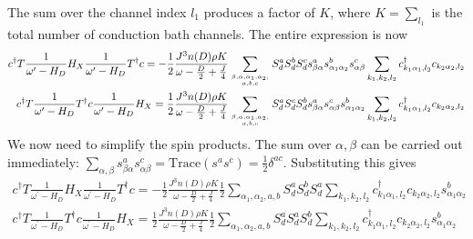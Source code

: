 \documentclass[12pt]{revtex4-2}
\begin{document}
The sum over the channel index \(l_1\) produces a factor of \(K\), where \(K = \sum_{l_1}\) is the total number of conduction bath channels. The entire expression is now
\begin{align}
	\label{first_term}
	c^\dagger T \frac{1}{\omega^\prime - H_D} H_X \frac{1}{\omega^\prime - H_D} T^\dagger c = -\frac{1}{2}\frac{J^3 n(D) \rho K}{\omega - \frac{D}{2} + \frac{J}{4}}\sum_{\beta, \alpha, \alpha_1,\alpha_2,\atop{a,b,c}} S_d^a S_d^b S_d^c s^a_{\beta \alpha} s^b_{\alpha_1 \alpha_2} s^c_{\alpha \beta} \sum_{k_1,k_2,l_2} c^\dagger_{k_1\alpha_1,l_2}c_{k_2 \alpha_2,l_2}\\
	c^\dagger T \frac{1}{\omega^\prime - H_D} T^\dagger c \frac{1}{\omega^\prime - H_D} H_X = \frac{1}{2}\frac{J^3 n(D) \rho K}{\omega - \frac{D}{2} + \frac{J}{4}}\sum_{\beta, \alpha, \alpha_1,\alpha_2,\atop{a,b,c}} S_d^a S_d^c S_d^b s^a_{\beta \alpha} s^c_{\alpha \beta} s^b_{\alpha_1 \alpha_2} \sum_{k_1,k_2,l_2}c^\dagger_{k_1\alpha_1,l_2}c_{k_2 \alpha_2,l_2}
\end{align}
We now need to simplify the spin products. The sum over \(\alpha,\beta\) can be carried out immediately: \(\sum_{\alpha,\beta} s^a_{\beta \alpha} s^c_{\alpha \beta} = \text{Trace}\left(s^a s^c\right) = \frac{1}{2}\delta^{ac}\). Substituting this gives
\begin{align}
	c^\dagger T \frac{1}{\omega^\prime - H_D} H_X \frac{1}{\omega^\prime - H_D} T^\dagger c = -\frac{1}{2}\frac{J^3 n(D) \rho K}{\omega - \frac{D}{2} + \frac{J}{4}}\frac{1}{2}\sum_{\alpha_1,\alpha_2,a,b} S_d^a S_d^b S_d^a \sum_{k_1,k_2,l_2} c^\dagger_{k_1\alpha_1,l_2}c_{k_2 \alpha_2,l_2}s^b_{\alpha_1 \alpha_2} \\
	c^\dagger T \frac{1}{\omega^\prime - H_D} T^\dagger c \frac{1}{\omega^\prime - H_D} H_X = \frac{1}{2}\frac{J^3 n(D) \rho K}{\omega - \frac{D}{2} + \frac{J}{4}} \frac{1}{2} \sum_{\alpha_1,\alpha_2,a,b} S_d^a S_d^a S_d^b \sum_{k_1,k_2,l_2}c^\dagger_{k_1\alpha_1,l_2}c_{k_2 \alpha_2,l_2}s^b_{\alpha_1 \alpha_2} 
\end{align}
\end{document}
